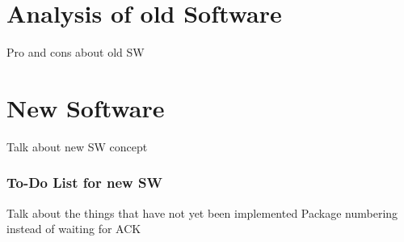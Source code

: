 %
\section{Analysis of old Software}%
%
Pro and cons about old SW
%
\section{New Software}%
%
Talk about new SW concept
%
\subsubsection{To-Do List for new SW}%
%
Talk about the things that have not yet been implemented
Package numbering instead of waiting for ACK